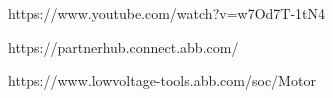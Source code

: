 https://www.youtube.com/watch?v=w7Od7T-1tN4

https://partnerhub.connect.abb.com/

https://www.lowvoltage-tools.abb.com/soc/Motor
